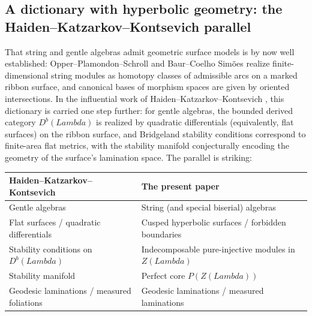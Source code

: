 \documentclass[11pt,a4paper,reqno]{amsart}
\def\mathcal#1{#1}%
\def\operatorname#1{#1}%
\def\Zg{Z}%
\def\Lambda{Lambda}%
\def\textbf#1{#1}%
\theoremstyle{definition}
\theoremstyle{remark}
\newcommand{\Zg}{\operatorname{Zg}}
\begin{document}
\subsection{A dictionary with hyperbolic geometry: the Haiden--Katzarkov--Kontsevich parallel}
\label{subsec:hkk_parallel}

That string and gentle algebras admit geometric surface models is by now well established: Opper--Plamondon--Schroll \cite{OPS2018} and Baur--Coelho Sim\~oes \cite{BCS2020} realize finite-dimensional string modules as homotopy classes of admissible arcs on a marked ribbon surface, and canonical bases of morphism spaces are given by oriented intersections. In the influential work of Haiden--Katzarkov--Kontsevich \cite{Haiden2017}, this dictionary is carried one step further: for gentle algebras, the bounded derived category $D^b(\Lambda)$ is realized by quadratic differentials (equivalently, flat surfaces) on the ribbon surface, and Bridgeland stability conditions correspond to finite-area flat metrics, with the stability manifold conjecturally encoding the geometry of the surface's lamination space. The parallel is striking:

\medskip
\begin{center}
\renewcommand{\arraystretch}{1.30}
\small
\begin{tabular}{@{}p{6.5cm}p{9cm}@{}}
\toprule
\textbf{Haiden--Katzarkov--Kontsevich \cite{Haiden2017}} & \textbf{The present paper} \\
\midrule
Gentle algebras & String (and special biserial) algebras \\[2pt]
Flat surfaces / quadratic differentials & Cusped hyperbolic surfaces / forbidden boundaries \\[2pt]
Stability conditions on $D^b(\Lambda)$ & Indecomposable pure-injective modules in $\Zg(\Lambda)$ \\[2pt]
Stability manifold & Perfect core $\mathcal{P}(\Zg(\Lambda))$ \\[2pt]
Geodesic laminations / measured foliations & Geodesic laminations / measured laminations \\
\bottomrule
\end{tabular}
\end{center}
\medskip
\end{document}
